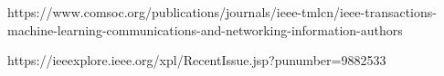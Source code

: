 

https://www.comsoc.org/publications/journals/ieee-tmlcn/ieee-transactions-machine-learning-communications-and-networking-information-authors


https://ieeexplore.ieee.org/xpl/RecentIssue.jsp?punumber=9882533

